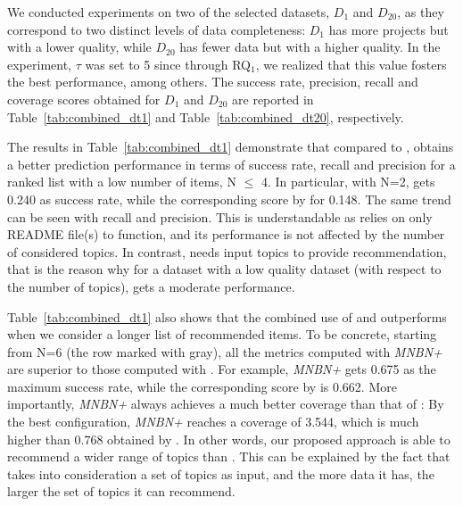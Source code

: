 We conducted experiments on two of the selected datasets, \ie $D_{1}$ and $D_{20}$, as they correspond to two distinct levels of data completeness: $D_{1}$ has more projects but with a lower quality, while $D_{20}$ has fewer data but with a higher quality. In the experiment, $\tau$ was set to 5 since through RQ$_1$, we realized that this value fosters the best performance, among others. %
The success rate, precision, recall and coverage scores obtained for $D_{1}$ and $D_{20}$ are reported in Table~\ref{tab:combined_dt1} and Table~\ref{tab:combined_dt20}, respectively. 

The results in Table~\ref{tab:combined_dt1} demonstrate that compared to \TF, \MNB obtains a better prediction performance in terms of success rate, recall and precision for a ranked list with a low number of items, \ie N $\leq$ 4. In particular, with N=2, \MNB gets 0.240 as success rate, while the corresponding score by \TF for 0.148. The same trend can be seen with recall and precision. This is understandable as \MNB relies on only README file(s) to function, and its performance is not affected by the number of considered topics. In contrast, \TF needs input topics to provide recommendation, that is the reason why for a dataset with a low quality dataset (with respect to the number of topics), \TF gets a moderate performance. %

Table~\ref{tab:combined_dt1} also shows that the combined use of \MNB and \TF 
outperforms \MNB when we consider a longer list of recommended items. To be 
concrete, starting from N=6 (\ie the row marked with gray), all the metrics 
computed with \textit{MNBN+\TF} are superior to those computed with \MNB. For 
example, \textit{MNBN+\TF} 
gets 0.675 as the maximum success rate, while the corresponding score by \MNB 
is 0.662. More importantly, \textit{MNBN+\TF} always achieves a much better 
coverage than 
that of \MNB: By the best configuration, \textit{MNBN+\TF} reaches a coverage 
of 3.544, which 
is much higher than 0.768 obtained by \MNB. In other words, our proposed 
approach is able to recommend a wider range of topics than \MNB. This can be 
explained by the fact that \TF takes into consideration a set of topics as 
input, and the more data it has, the larger the set of topics it can recommend.

